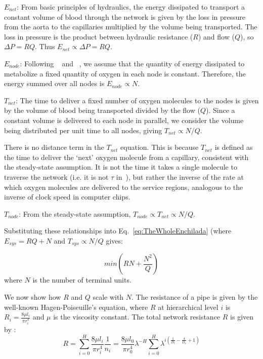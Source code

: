 \documentclass[12pt]{article}
\begin{document}
$E_{net}$: From basic principles of hydraulics, the energy dissipated to
transport a constant volume of blood through the network is given by the loss
in pressure from the aorta to the capillaries multiplied by the volume being
transported.  The loss in pressure is the product between hydraulic resistance ($R$) and
flow ($Q$), so $\Delta P = RQ$.  Thus $E_{net} \propto \Delta P = RQ$. 


$E_{node}$: Following ~\cite{west97} and ~\cite{moses08}, we assume that the
quantity of energy dissipated to metabolize a fixed quantity of oxygen in each
node is constant.  Therefore, the energy summed over all nodes is $E_{node} \propto
N$.

$T_{net}$: The time to deliver a fixed number of oxygen molecules to the nodes
is given by the volume of blood being transported divided by the flow ($Q$).
Since a constant volume is delivered to each node in parallel, we consider the
volume being distributed per unit time to all nodes, giving $T_{net}\propto
N/Q$.  

There is no distance term in the $T_{net}$ equation.  This is because $T_{net}$  is
defined as the time to deliver the `next'
oxygen molecule from a capillary, consistent with the
steady-state assumption.   It is not the time it takes a
single molecule to traverse the network (i.e. it is not $\tau$
in~\cite{banavar10}), but rather the inverse of the rate at which
oxygen molecules are delivered to the service regions, analogous to the inverse of clock speed in computer chips.

$T_{node}$: From the steady-state assumption, $T_{node} \propto T_{net} \propto N/Q$. 



Substituting these relationships into Eq.~\ref{eq:TheWholeEnchilada} (where $E_{sys} = RQ + N$ and $T_{sys} \propto N/Q$ gives:

\begin{equation}
 min (RN + \frac{N^2}{Q})
\label{eq:bio-min}
\end{equation}
\noindent where $N$ is the number of terminal units.  

We now show how $R$ and $Q$ scale with $N$. The resistance of a pipe is given by the well-known Hagen-Poiseuille's
equation, where $R$ at hierarchical level $i$ is $R_i = \frac{8\mu l_i}{\pi
r_i^4}$ and $\mu$ is the viscosity constant.  The total network resistance
$R$ is given by \cite{west97}:
\begin{equation}
\label{eq:resistance}
R = \sum_{i=0}^H \frac{8\mu l_i}{\pi r_i^4}\frac{1}{n_i}
= \frac{8\mu l_0}{\pi r_0^4} \lambda^{-H}\sum_{i=0}^H \lambda^{i 
\left(\frac{1}{D_l} - \frac{4}{D_r} + 1 \right)}
\end{equation}
\end{document}

